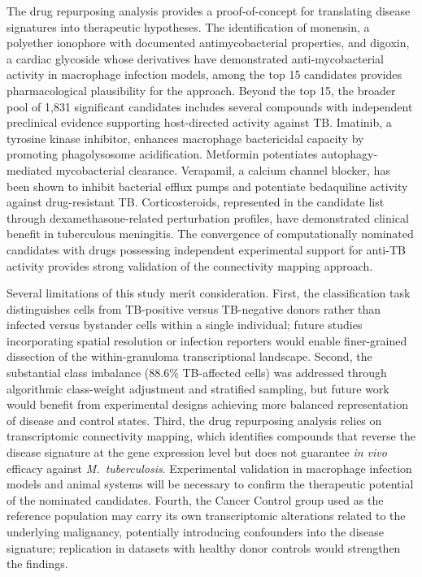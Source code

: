 \documentclass[12pt]{article}
\begin{document}
The drug repurposing analysis provides a proof-of-concept for translating disease signatures into therapeutic hypotheses. The identification of monensin, a polyether ionophore with documented antimycobacterial properties, and digoxin, a cardiac glycoside whose derivatives have demonstrated anti-mycobacterial activity in macrophage infection models, among the top 15 candidates provides pharmacological plausibility for the approach. Beyond the top 15, the broader pool of 1,831 significant candidates includes several compounds with independent preclinical evidence supporting host-directed activity against TB. Imatinib\cite{napier2016}, a tyrosine kinase inhibitor, enhances macrophage bactericidal capacity by promoting phagolysosome acidification. Metformin\cite{singhal2014,degner2018} potentiates autophagy-mediated mycobacterial clearance. Verapamil, a calcium channel blocker, has been shown to inhibit bacterial efflux pumps and potentiate bedaquiline activity against drug-resistant TB\cite{gupta2013,adams2011}. Corticosteroids, represented in the candidate list through dexamethasone-related perturbation profiles, have demonstrated clinical benefit in tuberculous meningitis\cite{thwaites2004}. The convergence of computationally nominated candidates with drugs possessing independent experimental support for anti-TB activity provides strong validation of the connectivity mapping approach.

Several limitations of this study merit consideration. First, the classification task distinguishes cells from TB-positive versus TB-negative donors rather than infected versus bystander cells within a single individual; future studies incorporating spatial resolution or infection reporters would enable finer-grained dissection of the within-granuloma transcriptional landscape. Second, the substantial class imbalance (88.6\% TB-affected cells) was addressed through algorithmic class-weight adjustment and stratified sampling, but future work would benefit from experimental designs achieving more balanced representation of disease and control states. Third, the drug repurposing analysis relies on transcriptomic connectivity mapping, which identifies compounds that reverse the disease signature at the gene expression level but does not guarantee \textit{in vivo} efficacy against \textit{M.~tuberculosis}. Experimental validation in macrophage infection models and animal systems will be necessary to confirm the therapeutic potential of the nominated candidates. Fourth, the Cancer Control group used as the reference population may carry its own transcriptomic alterations related to the underlying malignancy, potentially introducing confounders into the disease signature; replication in datasets with healthy donor controls would strengthen the findings.
\end{document}
